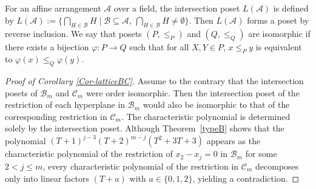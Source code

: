\documentclass{article}
\theoremstyle{plain}
\theoremstyle{definition}
\theoremstyle{remark}
\numberwithin{equation}{section}
\newcommand{\Bc}{\mathcal{B}}
\newcommand{\Cc}{\mathcal{C}}
\begin{document}
For an affine arrangement $\mathcal{A}$ over a field, the intersection poset $L(\mathcal{A})$ is defined by $L(\mathcal{A}):=\{\bigcap_{H\in\mathcal{B}} H\mid \mathcal{B}\subseteq \mathcal{A},\ \bigcap_{H\in\mathcal{B}} H\neq\emptyset\}$.
Then $L(\mathcal{A})$ forms a poset by reverse inclusion.
We say that posets $(P,\le_P)$ and $(Q,\le_Q)$ are isomorphic if there exists a bijection $\varphi \colon P \to Q$ such that for all $X,Y \in P$, $x \le_P y$ is equivalent to $\varphi(x) \le_Q \varphi(y)$.
\begin{proof}[Proof of Corollary \ref{Cor-latticeBC}]
Assume to the contrary that the intersection posets of $\Bc_m$ and $\Cc_m$ were order isomorphic. Then the intersection poset of the restriction of each hyperplane in $\Bc_m$ would also be isomorphic to that of the corresponding restriction in $\Cc_m$.
The characteristic polynomial is determined solely by the intersection poset.
Although Theorem~\ref{typeB} shows that the polynomial $(T+1)^{j-3}(T+2)^{m-j}(T^2+3T+3)$ appears as the characteristic polynomial of the restriction of ${x_2-x_j=0}$ in $\Bc_m$ for some $2<j \leq m$, every characteristic polynomial of the restriction in $\Cc_m$ decomposes only into linear factors $(T+a)$ with $a\in \{0,1,2\}$, yielding a contradiction.
\end{proof} 
\end{document}
